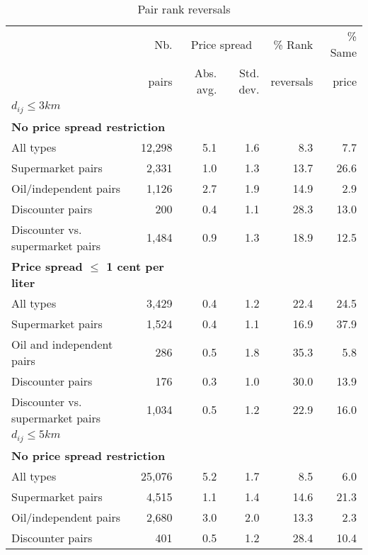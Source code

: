 \documentclass[english]{article}
\begin{document}
\begin{table}[H]
\begin{threeparttable}
\renewcommand{\arraystretch}{0.8} %
\caption{Pair rank reversals}
\label{tab:stats_pair_rank_reversals}
\begin{tabular}{lrrrrr}
\hline
\hline
      & Nb.   & \multicolumn{2}{c}{Price spread} & \% Rank   & \% Same\\
\cmidrule(l{2pt}r{2pt}){3-4}
      & pairs & Abs. avg.  & Std. dev.           & reversals & price \\
\hline
\textbf{$d_{ij} \le  3 km$} &       &       &       &       &  \\
\hline
\multicolumn{2}{l}{\textbf{No price spread restriction}}  &       &       &       &  \\
All types & 12,298 & 5.1   & 1.6   & 8.3   & 7.7 \\
Supermarket pairs & 2,331 & 1.0   & 1.3   & 13.7  & 26.6 \\
Oil/independent pairs & 1,126 & 2.7   & 1.9   & 14.9  & 2.9 \\
Discounter pairs & 200   & 0.4   & 1.1   & 28.3  & 13.0 \\
Discounter vs. supermarket pairs & 1,484 & 0.9   & 1.3   & 18.9  & 12.5 \\
\hline
\multicolumn{2}{l}{\textbf{Price spread $\le$ 1 cent per liter}}   &       &       &       &  \\
All types & 3,429 & 0.4   & 1.2   & 22.4  & 24.5 \\
Supermarket pairs & 1,524 & 0.4   & 1.1   & 16.9  & 37.9 \\
Oil and independent pairs & 286   & 0.5   & 1.8   & 35.3  & 5.8 \\
Discounter pairs & 176   & 0.3   & 1.0   & 30.0  & 13.9 \\
Discounter vs. supermarket pairs & 1,034 & 0.5   & 1.2   & 22.9  & 16.0 \\
\hline
\textbf{$d_{ij} \le  5 km$} &       &       &       &       &  \\
\hline
\multicolumn{2}{l}{\textbf{No price spread restriction}}   &       &       &       &  \\
All types & 25,076 & 5.2   & 1.7   & 8.5   & 6.0 \\
Supermarket pairs & 4,515 & 1.1   & 1.4   & 14.6  & 21.3 \\
Oil/independent pairs & 2,680 & 3.0   & 2.0   & 13.3  & 2.3 \\
Discounter pairs & 401   & 0.5   & 1.2   & 28.4  & 10.4 \\

\end{tabular}
\end{threeparttable}
\end{table}
\end{document}
